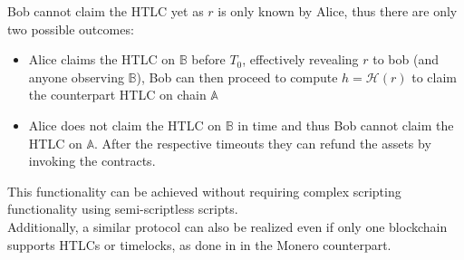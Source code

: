 \documentclass{article}      	%
\begin{document}
Bob cannot claim the HTLC yet as $r$ is only known by Alice, thus there are only two possible outcomes:
\begin{itemize}
\item Alice claims the HTLC on $\mathbb{B}$ before $T_0$, effectively revealing $r$ to bob (and anyone observing $\mathbb{B}$), Bob can then proceed to compute $h = \mathcal{H}(r)$ to claim the counterpart HTLC on chain $\mathbb{A}$ 
\item Alice does not claim the HTLC on $\mathbb{B}$ in time and thus Bob cannot claim the HTLC on $\mathbb{A}$. After the respective timeouts they can refund the assets by invoking the contracts.
\end{itemize}

This functionality can be achieved without requiring complex scripting functionality \cite{h4sh3d} using semi-scriptless scripts. \\
Additionally, a similar protocol can also be realized even if only one blockchain supports HTLCs or timelocks, as done in \cite{h4sh3d} in the Monero counterpart.


\end{document}
